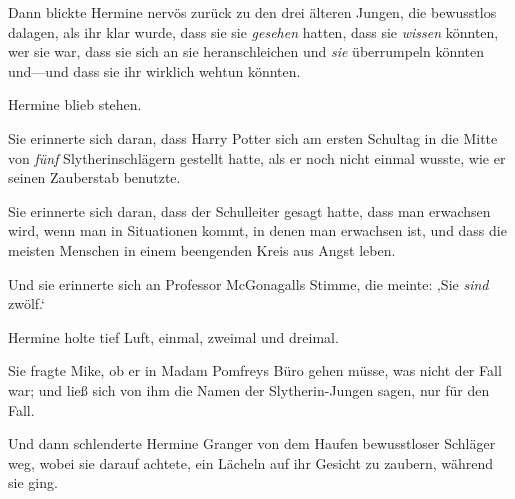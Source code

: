 Dann blickte Hermine nervös zurück zu den drei älteren Jungen, die bewusstlos dalagen, als ihr klar wurde, dass sie sie \emph{gesehen} hatten, dass sie \emph{wissen} könnten, wer sie war, dass sie sich an sie heranschleichen und \emph{sie} überrumpeln könnten und—und dass sie ihr wirklich wehtun könnten.

Hermine blieb stehen.

Sie erinnerte sich daran, dass Harry Potter sich am ersten Schultag in die Mitte von \emph{fünf} Slytherinschlägern gestellt hatte, als er noch nicht einmal wusste, wie er seinen Zauberstab benutzte.

Sie erinnerte sich daran, dass der Schulleiter gesagt hatte, dass man erwachsen wird, wenn man in Situationen kommt, in denen man erwachsen ist, und dass die meisten Menschen in einem beengenden Kreis aus Angst leben.

Und sie erinnerte sich an Professor McGonagalls Stimme, die meinte: ‚Sie \emph{sind} zwölf.‘

Hermine holte tief Luft, einmal, zweimal und dreimal.

Sie fragte Mike, ob er in Madam Pomfreys Büro gehen müsse, was nicht der Fall war; und ließ sich von ihm die Namen der Slytherin-Jungen sagen, nur für den Fall.

Und dann schlenderte Hermine Granger von dem Haufen bewusstloser Schläger weg, wobei sie darauf achtete, ein Lächeln auf ihr Gesicht zu zaubern, während sie ging.

